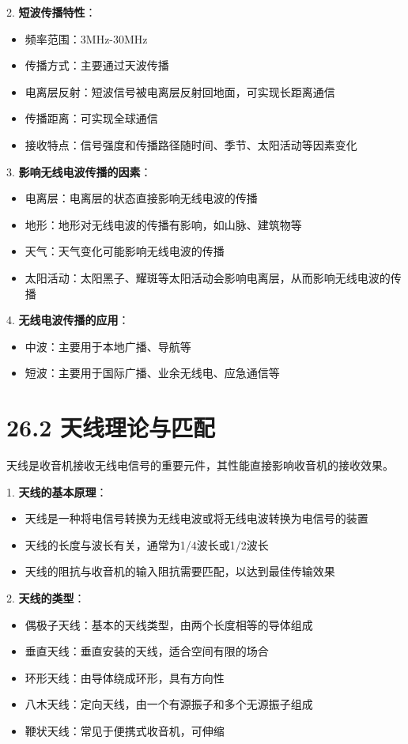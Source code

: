 \documentclass[12pt,UTF8]{ctexbook}
\begin{document}
2. \textbf{短波传播特性}：
   \begin{itemize}[leftmargin=3.5em]
   \item 频率范围：3MHz-30MHz
   \item 传播方式：主要通过天波传播
   \item 电离层反射：短波信号被电离层反射回地面，可实现长距离通信
   \item 传播距离：可实现全球通信
   \item 接收特点：信号强度和传播路径随时间、季节、太阳活动等因素变化
   \end{itemize}

3. \textbf{影响无线电波传播的因素}：
   \begin{itemize}[leftmargin=3.5em]
   \item 电离层：电离层的状态直接影响无线电波的传播
   \item 地形：地形对无线电波的传播有影响，如山脉、建筑物等
   \item 天气：天气变化可能影响无线电波的传播
   \item 太阳活动：太阳黑子、耀斑等太阳活动会影响电离层，从而影响无线电波的传播
   \end{itemize}

4. \textbf{无线电波传播的应用}：
   \begin{itemize}[leftmargin=3.5em]
   \item 中波：主要用于本地广播、导航等
   \item 短波：主要用于国际广播、业余无线电、应急通信等
   \end{itemize}

\section*{26.2 天线理论与匹配}

天线是收音机接收无线电信号的重要元件，其性能直接影响收音机的接收效果。

1. \textbf{天线的基本原理}：
   \begin{itemize}[leftmargin=3.5em]
   \item 天线是一种将电信号转换为无线电波或将无线电波转换为电信号的装置
   \item 天线的长度与波长有关，通常为1/4波长或1/2波长
   \item 天线的阻抗与收音机的输入阻抗需要匹配，以达到最佳传输效果
   \end{itemize}

2. \textbf{天线的类型}：
   \begin{itemize}[leftmargin=3.5em]
   \item 偶极子天线：基本的天线类型，由两个长度相等的导体组成
   \item 垂直天线：垂直安装的天线，适合空间有限的场合
   \item 环形天线：由导体绕成环形，具有方向性
   \item 八木天线：定向天线，由一个有源振子和多个无源振子组成
   \item 鞭状天线：常见于便携式收音机，可伸缩
   \end{itemize}
\end{document}
